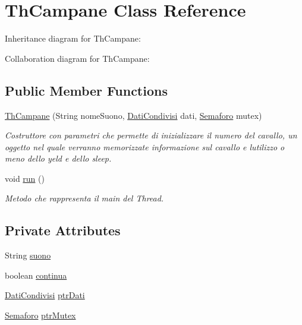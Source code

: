 \hypertarget{classcampane_1_1_th_campane}{}\section{Th\+Campane Class Reference}
\label{classcampane_1_1_th_campane}


Inheritance diagram for Th\+Campane\+:


Collaboration diagram for Th\+Campane\+:
\subsection*{Public Member Functions}
\begin{DoxyCompactItemize}
\item 
\hyperlink{classcampane_1_1_th_campane_a67a81be1063d81b688bac2ee6b04d5dc}{Th\+Campane} (String nome\+Suono, \hyperlink{classcampane_1_1_dati_condivisi}{Dati\+Condivisi} dati, \hyperlink{classcampane_1_1_semaforo}{Semaforo} mutex)
\begin{DoxyCompactList}\small\item\em Costruttore con parametri che permette di inizializzare il numero del cavallo, un oggetto nel quale verranno memorizzate informazione sul cavallo e l\textquotesingle{}utilizzo o meno dello yeld e dello sleep. \end{DoxyCompactList}\item 
void \hyperlink{classcampane_1_1_th_campane_a13a43e6d814de94978c515cb084873b1}{run} ()
\begin{DoxyCompactList}\small\item\em Metodo che rappresenta il main del Thread. \end{DoxyCompactList}\end{DoxyCompactItemize}
\subsection*{Private Attributes}
\begin{DoxyCompactItemize}
\item 
String \hyperlink{classcampane_1_1_th_campane_a8e2bdcee9d569ad59a224068e53bd3f2}{suono}
\item 
boolean \hyperlink{classcampane_1_1_th_campane_a135f40f8b2d0ba748791e390adac4e13}{continua}
\item 
\hyperlink{classcampane_1_1_dati_condivisi}{Dati\+Condivisi} \hyperlink{classcampane_1_1_th_campane_af3ade885f29d5a10bb194e8e3e1480c5}{ptr\+Dati}
\item 
\hyperlink{classcampane_1_1_semaforo}{Semaforo} \hyperlink{classcampane_1_1_th_campane_a83b472201ffa84b0afd563d6028fd4d8}{ptr\+Mutex}
\end{DoxyCompactItemize}


